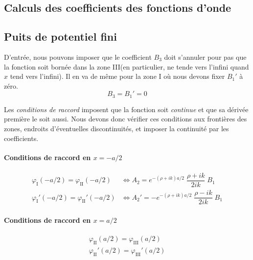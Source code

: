 \documentclass[12pt, a4paper]{book}
\begin{document}
\begin{appendix}
\chapter{Calculs des coefficients des fonctions d'onde}
  \section{Puits de potentiel fini} \label{annexe-CalculCoefficients-PuitsFini}
  D'entrée, nous pouvons imposer que le coefficient $B_3$ doit s'annuler pour pas que la fonction soit bornée dans la zone III(en particulier, ne tende vers l'infini quand $x$ tend vers l'infini). Il en va de même pour la zone I où nous devons fixer $B_1 '$ à zéro. $$B_3 = B_1 '=  0 $$

Les \textit{conditions de raccord} imposent que la fonction soit \textit{continue} et que sa dérivée première le soit aussi. Nous devons donc vérifier ces conditions aux frontières des zones, endroits d'éventuelles discontinuités, et imposer la continuité par les coefficients.
\subsubsection{Conditions de raccord en $x=-a/2$}
\begin{align}
  \varphi_{\mathrm{I}}(-a/2) = \varphi_{\mathrm{II}} (-a/2) &\iff A_2 = e^{-(\rho + ik) a/2} \;  \dfrac{\rho + ik}{2ik} \; B_1 \\
  \varphi_{\mathrm{I}} '(-a/2) = \varphi_{\mathrm{II}} ' (-a/2) &\iff A_2 ' =  -e^{-(\rho  + ik)a/2} \; \dfrac{\rho - ik}{2ik} \; B_1 
\end{align}

\subsubsection{Conditions de raccord en $x=a/2$}
\begin{align}
  \varphi_{\mathrm{II}}(a/2) =  \varphi_{\mathrm{III}}(a/2)\\
  \varphi_{\mathrm{II}}'(a/2) =  \varphi_{\mathrm{III}}'(a/2)
\end{align}
\end{appendix}
\end{document}
